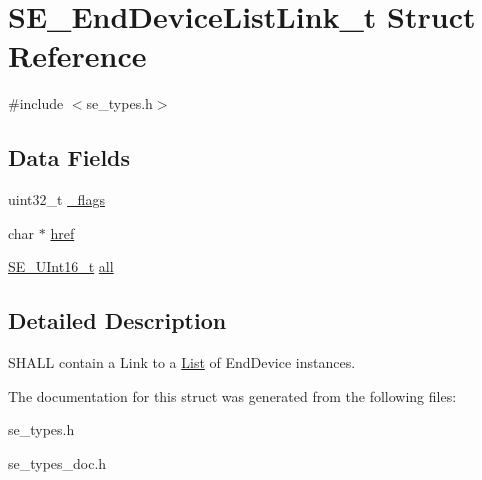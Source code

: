 \hypertarget{structSE__EndDeviceListLink__t}{}\section{S\+E\+\_\+\+End\+Device\+List\+Link\+\_\+t Struct Reference}
\label{structSE__EndDeviceListLink__t}


{\ttfamily \#include $<$se\+\_\+types.\+h$>$}

\subsection*{Data Fields}
\begin{DoxyCompactItemize}
\item 
uint32\+\_\+t \hyperlink{group__EndDeviceListLink_ga875ed914707e5607614df916298bef65}{\+\_\+flags}
\item 
char $\ast$ \hyperlink{group__EndDeviceListLink_ga240c0bf38b6059ce62221922aee9b08f}{href}
\item 
\hyperlink{group__UInt16_gac68d541f189538bfd30cfaa712d20d29}{S\+E\+\_\+\+U\+Int16\+\_\+t} \hyperlink{group__EndDeviceListLink_gae6814db0fb5e290316ad9b78953de83a}{all}
\end{DoxyCompactItemize}


\subsection{Detailed Description}
S\+H\+A\+LL contain a Link to a \hyperlink{structList}{List} of End\+Device instances. 

The documentation for this struct was generated from the following files\+:\begin{DoxyCompactItemize}
\item 
se\+\_\+types.\+h\item 
se\+\_\+types\+\_\+doc.\+h\end{DoxyCompactItemize}

